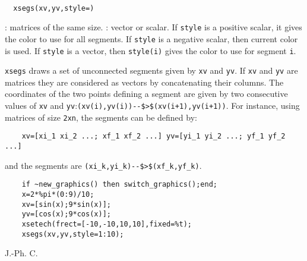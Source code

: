 \begin{mandesc}
  \\
\end{mandesc}
\begin{calling_sequence}
\begin{verbatim}
  xsegs(xv,yv,style=)
\end{verbatim}
\end{calling_sequence}

\begin{parameters}
  \begin{varlist}
    : matrices of the same size.
    : vector or scalar. If \verb!style! is a positive scalar,
    it gives the color to use for all segments. If \verb!style! is
    a negative scalar, then current color is used. If \verb!style!
    is a vector, then \verb!style(i)! gives the color to use for
    segment \verb!i!.\end{varlist}
\end{parameters}

\begin{mandescription}
  \verb!xsegs! draws a set of unconnected segments given by \verb!xv! and
  \verb!yv!. If \verb!xv! and \verb!yv! are matrices they are considered as
  vectors by concatenating their columns. The coordinates of the two points
  defining a segment are given by two consecutive values of \verb!xv! and
  \verb!yv!:\verb!(xv(i),yv(i))--$>$(xv(i+1),yv(i+1))!. For instance, using
  matrices of size \verb!2xn!, the segments can be defined by:
  \begin{Verbatim}
    xv=[xi_1 xi_2 ...; xf_1 xf_2 ...] yv=[yi_1 yi_2 ...; yf_1 yf_2  ...]
  \end{Verbatim}
  and the segments are \verb!(xi_k,yi_k)--$>$(xf_k,yf_k)!.
\end{mandescription}
\begin{examples}
  \begin{Verbatim}
    if ~new_graphics() then switch_graphics();end;
    x=2*%pi*(0:9)/10;
    xv=[sin(x);9*sin(x)];
    yv=[cos(x);9*cos(x)];
    xsetech(frect=[-10,-10,10,10],fixed=%t);
    xsegs(xv,yv,style=1:10);
  \end{Verbatim}
\end{examples}
\begin{authors}
  J.-Ph. C.
\end{authors}
